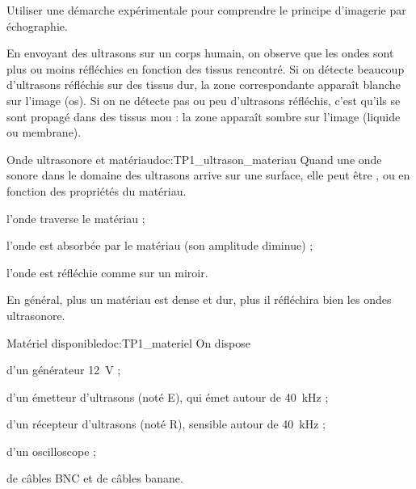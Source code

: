 \teteTermStssImag



\begin{objectifs}
  \item Utiliser une démarche expérimentale pour comprendre le principe d'imagerie par échographie.
\end{objectifs}

\begin{contexte}
  En envoyant des ultrasons sur un corps humain, on observe que les ondes sont plus ou moins réfléchies en fonction des tissus rencontré.
  Si on détecte beaucoup d'ultrasons réfléchis sur des tissus dur, la zone correspondante apparaît blanche sur l’image (os).
  Si on ne détecte pas ou peu d’ultrasons réfléchis, c’est qu’ils se sont propagé dans des tissus mou : la zone apparaît sombre sur l’image (liquide ou membrane).
  
\end{contexte}


\begin{doc}{Onde ultrasonore et matériau}{doc:TP1_ultrason_materiau}
  Quand une onde sonore dans le domaine des ultrasons arrive sur une surface,
  elle peut être ,  ou  en fonction des propriétés du matériau.
  \begin{listePoints}
    \item {} l'onde traverse le matériau ;
    \item {} l'onde est absorbée par le matériau (son amplitude diminue) ;
    \item {} l'onde est réfléchie comme sur un miroir.
  \end{listePoints}

  En général, plus un matériau est dense et dur, plus il réfléchira bien les ondes ultrasonore.
\end{doc}

\begin{doc}{Matériel disponible}{doc:TP1_materiel}
  On dispose 
  \begin{listeTirets}
    \item d'un générateur \qty{12}{\volt} ;
    \item d'un émetteur d'ultrasons (noté E), qui émet autour de \qty{40}{\kilo\hertz} ;
    \item d'un récepteur d'ultrasons (noté R), sensible autour de \qty{40}{\kilo\hertz} ;
    \item d'un oscilloscope ;
    \item de câbles BNC et de câbles banane.
  \end{listeTirets}
\end{doc}

